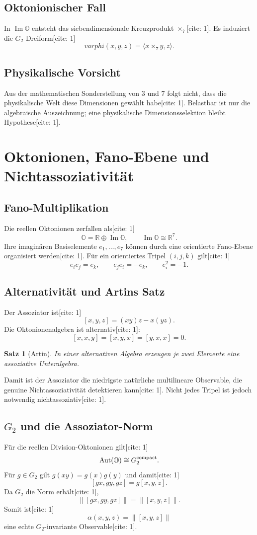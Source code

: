 \documentclass[11pt,a4paper]{article}
\newtheorem{theorem}{Satz}[section]
\newcommand{\OO}{\mathbb{O}}
\newcommand{\RR}{\mathbb{R}}
\newcommand{\norm}[1]{\left\lVert #1 \right\rVert}
\newcommand{\Aut}{\operatorname{Aut}}
\begin{document}
	\subsection{Oktonionischer Fall}
	In $\operatorname{Im}\OO$ entsteht das siebendimensionale Kreuzprodukt $\times_7$[cite: 1]. Es induziert die $G_2$-Dreiform[cite: 1]
	\[
	varphi(x,y,z)=\langle x\times_7y,z\rangle.
	\]
	
	\subsection{Physikalische Vorsicht}
	Aus der mathematischen Sonderstellung von $3$ und $7$ folgt nicht, dass die physikalische Welt diese Dimensionen gewählt habe[cite: 1]. Belastbar ist nur die algebraische Auszeichnung; eine physikalische Dimensionsselektion bleibt Hypothese[cite: 1].
	
	\section{Oktonionen, Fano-Ebene und Nichtassoziativität}
	\subsection{Fano-Multiplikation}
	Die reellen Oktonionen zerfallen als[cite: 1]
	\[
	\OO=\RR\oplus\operatorname{Im}\OO,\qquad \operatorname{Im}\OO\cong\RR^7.
	\]
	Ihre imaginären Basiselemente $e_1,\dots,e_7$ können durch eine orientierte Fano-Ebene organisiert werden[cite: 1]. Für ein orientiertes Tripel $(i,j,k)$ gilt[cite: 1]
	\[
	e_ie_j=e_k,\qquad e_je_i=-e_k,\qquad e_i^2=-1.
	\]
	
	\subsection{Alternativität und Artins Satz}
	Der Assoziator ist[cite: 1]
	\[
	[x,y,z]=(xy)z-x(yz).
	\]
	Die Oktonionenalgebra ist alternativ[cite: 1]:
	\[
	[x,x,y]=[x,y,x]=[y,x,x]=0.
	\]
	\begin{theorem}[Artin]
		In einer alternativen Algebra erzeugen je zwei Elemente eine assoziative Unteralgebra.
	\end{theorem}
	Damit ist der Assoziator die niedrigste natürliche multilineare Observable, die genuine Nichtassoziativität detektieren kann[cite: 1]. Nicht jedes Tripel ist jedoch notwendig nichtassoziativ[cite: 1].
	
	\subsection{$G_2$ und die Assoziator-Norm}
	Für die reellen Division-Oktonionen gilt[cite: 1]
	\[
	\Aut(\OO)\cong G_2^{\rm compact}.
	\]
	Für $g\in G_2$ gilt $g(xy)=g(x)g(y)$ und damit[cite: 1]
	\[
	[gx,gy,gz]=g[x,y,z].
	\]
	Da $G_2$ die Norm erhält[cite: 1],
	\[
	\boxed{\norm{[gx,gy,gz]}=\norm{[x,y,z]}.}
	\]
	Somit ist[cite: 1]
	\[
	\boxed{\alpha(x,y,z)=\norm{[x,y,z]}}
	\]
	eine echte $G_2$-invariante Observable[cite: 1].
	
\end{document}
